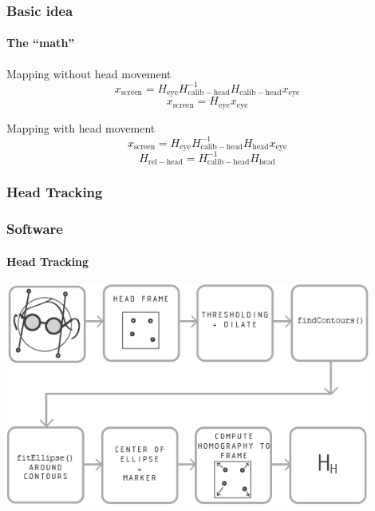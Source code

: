 \documentclass[%
14pt
]{beamer}
\begin{document}
\begin{frame}
	\frametitle{Basic idea}
  \framesubtitle{The ``math''}
  \begin{block}{Mapping without head movement}
    \begin{equation*}
      x_\mathrm{screen} = H_\mathrm{eye} H_\mathrm{calib-head} ^{-1} H_\mathrm{calib-head} x_\mathrm{eye}
    \end{equation*}
    \begin{equation*}
      x_\mathrm{screen} = H_\mathrm{eye}  x_\mathrm{eye}
    \end{equation*}
  \end{block}\pause
  \begin{block}{Mapping with head movement}
    \begin{equation*}
      x_\mathrm{screen} = H_\mathrm{eye} H_\mathrm{calib-head} ^{-1} H_\mathrm{head} x_\mathrm{eye}
    \end{equation*}
    \begin{equation*}
      H_\mathrm{rel-head} = H_\mathrm{calib-head}^{-1} H_\mathrm{head}
    \end{equation*}
  \end{block}
\end{frame}

\subsubsection{Head Tracking}
\begin{frame}
	\frametitle{Software}
  \framesubtitle{Head Tracking}
  \vspace*{-0.5cm}
  \begin{center}
    \includegraphics[width=0.9\textwidth]{03.png}
  \end{center}
\end{frame}
\end{document}
